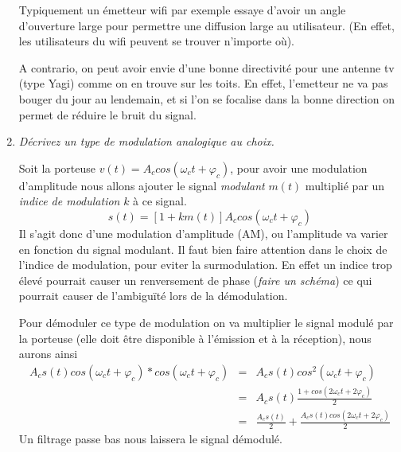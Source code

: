 \documentclass[a4paper, 11pt]{article}
\begin{document}
\begin{enumerate}
Typiquement un émetteur wifi par exemple essaye d'avoir un angle d'ouverture large pour permettre une diffusion large au utilisateur. (En effet, les utilisateurs du wifi peuvent se trouver n'importe où).

A contrario, on peut avoir envie d'une bonne directivité pour une antenne tv (type Yagi) comme on en trouve sur les toits. En effet, l'emetteur ne va pas bouger du jour au lendemain, et si l'on se focalise dans la bonne direction on permet de réduire le bruit du signal.

\item \textit{Décrivez un type de modulation analogique au choix.}

Soit la porteuse $v(t) = A_c cos(\omega_c t + \varphi_c)$, pour avoir une modulation d'amplitude nous allons ajouter le signal \textit{modulant} $m(t)$ multiplié par un \textit{indice de modulation} $k$ à ce signal.
$$s(t) = [1+km(t)] A_c cos(\omega_c t + \varphi_c)$$
Il s'agit donc d'une modulation d'amplitude (AM), ou l'amplitude va varier en fonction du signal modulant. Il faut bien faire attention dans le choix de l'indice de modulation, pour eviter la surmodulation. En effet un indice trop élevé pourrait causer un renversement de phase (\textit{faire un schéma}) ce qui pourrait causer de l'ambiguïté lors de la démodulation.

Pour démoduler ce type de modulation on va multiplier le signal modulé par la porteuse (elle doit être disponible à l'émission et à la réception), nous aurons ainsi
\begin{eqnarray*}
A_c s(t)cos(\omega_c t + \varphi_c)*cos(\omega_c t + \varphi_c) &=&A_c s(t)cos^2(\omega_c t + \varphi_c)\\
&=& A_c s(t) \frac{1+ cos(2\omega_c t + 2\varphi_c)}{2}\\
&=& \frac{A_cs(t)}{2} + \frac{A_cs(t)cos(2\omega_c t + 2\varphi_c)}{2}
\end{eqnarray*}
Un filtrage passe bas nous laissera le signal démodulé.


\end{enumerate}
\end{document}
